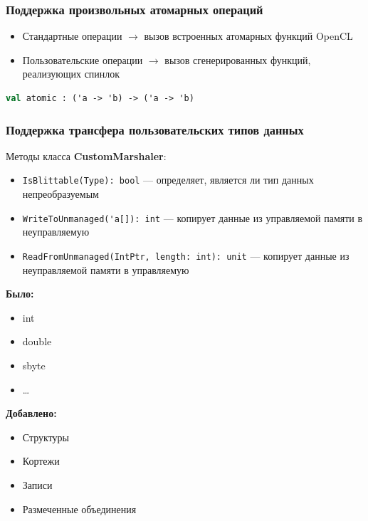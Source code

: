 \documentclass[aspectratio=169]{beamer}
\begin{document}
\begin{frame}[fragile]
  \frametitle{Поддержка произвольных атомарных операций}
  \begin{itemize}
      \item Стандартные операции $\xrightarrow{}$ вызов встроенных атомарных функций OpenCL
      \item Пользовательские операции $\xrightarrow{}$ вызов сгенерированных функций, реализующих спинлок
  \end{itemize}
\bigskip
\begin{lstlisting}[caption=Сигнатура функции atomic, language=Caml, frame=single, label={lst:atomic}, morekeywords={val}]
val atomic : ('a -> 'b) -> ('a -> 'b)
\end{lstlisting}
\end{frame}
            
\begin{frame}[fragile]
  \frametitle{Поддержка трансфера пользовательских типов данных}
  Методы класса \textbf{CustomMarshaler}:
\begin{itemize}
\item \verb|IsBlittable(Type): bool| --- определяет, является ли тип данных непреобразуемым
\item \verb|WriteToUnmanaged('a[]): int| --- копирует данные из управляемой памяти в неуправляемую
\item \verb|ReadFromUnmanaged(IntPtr, length: int): unit| --- копирует данные из неуправляемой памяти в управляемую
\end{itemize}

\bigskip

  \begin{minipage}{0.3\textwidth}
  \textbf{Было:}
  \begin{itemize}
    \item int
    \item double
    \item sbyte
    \item \ldots
  \end{itemize}
\end{minipage}
\hfill
\begin{minipage}{0.55\textwidth}
  \textbf{Добавлено:}
  \begin{itemize}
    \item Структуры
  	\item Кортежи
    \item Записи
    \item Размеченные объединения
  \end{itemize}
\end{minipage}
\\
\end{frame}
       
\end{document}
